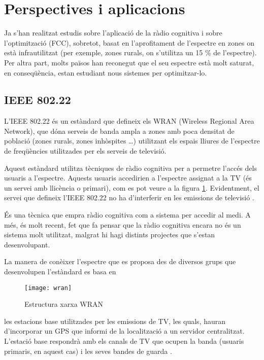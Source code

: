 \documentclass[10pt,journal,a4paper]{IEEEtran}
\begin{document}
\section{Perspectives i aplicacions}
Ja s'han realitzat estudis sobre l'aplicació de la ràdio cognitiva i sobre l'optimització (FCC), sobretot, basat en l'aprofitament de l'espectre en zones on està infrautilitzat (per exemple, zones rurals, on s'utilitza un 15 \% de l'espectre). 
Per altra part, molts països han reconegut que el seu espectre està molt saturat, en conseqüència, estan estudiant nous sistemes per optimitzar-lo.

\subsection*{IEEE 802.22} \label{sub:ieee}
L'IEEE 802.22 és un estàndard que defineix els WRAN (Wireless Regional Area Network), que dóna serveis de banda ampla a zones amb poca densitat de població (zones rurals, zones inhòspites \ldots) utilitzant els espais lliures de l'espectre de freqüències utilitzades per els serveis de televisió.

Aquest estàndard utilitza tècniques de ràdio cognitiva per a permetre l'accés dels usuaris a l'espectre. Aquests usuaris accedirien a l'espectre assignat a la TV (és un servei amb llicència o primari), com es pot veure a la figura \ref{wran}. 
Evidentment, el servei que defineix l'IEEE 802.22 no ha d'interferir en les emissions de televisió .


És una tècnica que empra ràdio cognitiva com a sistema per accedir al medi. A més, és molt recent, fet que fa pensar que la ràdio cognitiva encara no és un sistema molt utilitzat, malgrat hi hagi distints projectes que s'estan desenvolupant.



La manera de conèixer l'espectre que es proposa des de diversos grups que desenvolupen l'estàndard es basa en
\begin{figure}
  \centering
 \texttt{[image: wran]}
  \caption{Estructura xarxa WRAN}
  \label{wran}
\end{figure}
les estacions base utilitzades per les emissions de TV, les quals, hauran d'incorporar un GPS que informi de la localització a un servidor centralitzat. L'estació base respondrà amb els canals de TV que ocupen la banda (usuaris primaris, en aquest cas) i les seves bandes de guarda \cite{wran_wiki}. 
\end{document}
